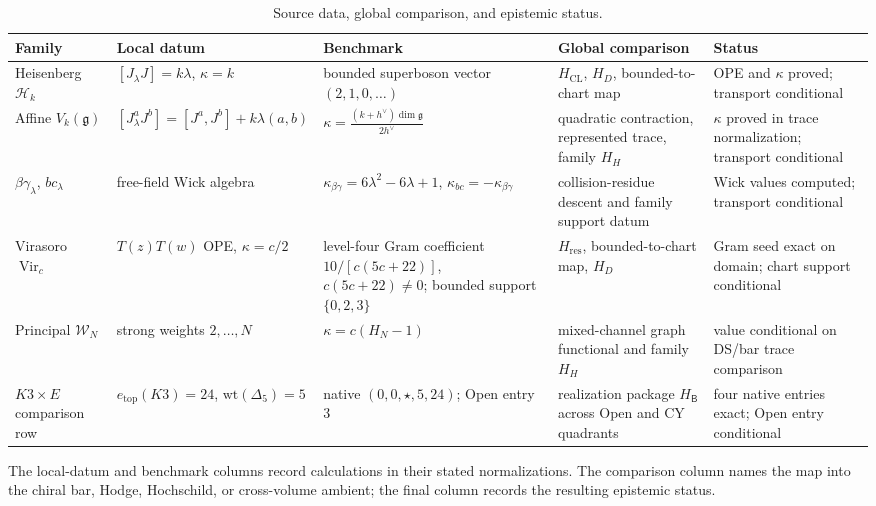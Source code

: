 \documentclass[11pt]{article}
\theoremstyle{plain}
\theoremstyle{definition}
\theoremstyle{remark}
\newcommand{\fg}{\mathfrak{g}}
\newcommand{\cH}{\mathcal{H}}
\newcommand{\cW}{\mathcal{W}}
\begin{document}
\begin{table}[ht]
\centering
\caption{Source data, global comparison, and epistemic status.}
\label{tab:census}
\renewcommand{\arraystretch}{1.25}
\small
\begin{tabular}{@{}p{}p{}
p{}p{}p{}@{}}
\toprule
\textbf{Family} & \textbf{Local datum}
& \textbf{Benchmark} & \textbf{Global comparison}
& \textbf{Status} \\
\midrule
Heisenberg \(\cH_k\)
& \([J_\lambda J]=k\lambda\), \(\kappa=k\)
& bounded superboson vector \((2,1,0,\ldots)\)
& \(H_{\mathrm{CL}}\), \(H_D\), bounded-to-chart map
& OPE and \(\kappa\) proved; transport conditional \\

Affine \(V_k(\fg)\)
& \([J^a_\lambda J^b]=[J^a,J^b]+k\lambda(a,b)\)
& \(\displaystyle
 \kappa=\frac{(k+h^\vee)\dim\fg}{2h^\vee}\)
& quadratic contraction, represented trace, family \(H_H\)
& \(\kappa\) proved in trace normalization; transport conditional \\

\(\beta\gamma_\lambda\), \(bc_\lambda\)
& free-field Wick algebra
& \(\kappa_{\beta\gamma}=6\lambda^2-6\lambda+1\),
  \(\kappa_{bc}=-\kappa_{\beta\gamma}\)
& collision-residue descent and family support datum
& Wick values computed; transport conditional \\

Virasoro \(\operatorname{Vir}_c\)
& \(T(z)T(w)\) OPE, \(\kappa=c/2\)
& level-four Gram coefficient
  \(\displaystyle 10/[c(5c+22)]\), \(c(5c+22)\ne0\);
  bounded support \(\{0,2,3\}\)
& \(H_{\mathrm{res}}\), bounded-to-chart map, \(H_D\)
& Gram seed exact on domain; chart support conditional \\

Principal \(\cW_N\)
& strong weights \(2,\ldots,N\)
& \(\displaystyle\kappa=c(H_N-1)\)
& mixed-channel graph functional and family \(H_H\)
& value conditional on DS/bar trace comparison \\

\(K3\times E\) comparison row
& \(e_{\mathrm{top}}(K3)=24\), \(\mathrm{wt}(\Delta_5)=5\)
& native \((0,0,\star,5,24)\); Open entry~$3$
& realization package \(H_{\mathsf B}\) across Open and CY quadrants
& four native entries exact; Open entry conditional \\
\bottomrule
\end{tabular}
\end{table}

The local-datum and benchmark columns record calculations in their
stated normalizations.  The comparison column names the map into the
chiral bar, Hodge, Hochschild, or cross-volume ambient; the final
column records the resulting epistemic status.
\end{document}
